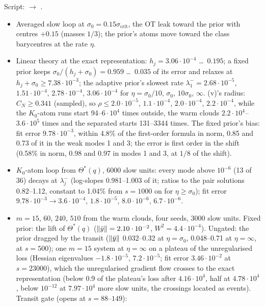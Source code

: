 Script:  $\to$ .
\begin{itemize}
  \item Averaged slow loop at $\sigma_0=0.15\sigma_{\mathrm{crit}}$, the OT leak toward the prior with centres $+0.15$
    (masses $1/3$); the prior's atoms move toward the class barycentres at the rate $\eta$.
  \item Linear theory at the exact representation: $h_j=3.06\cdot10^{-4}$ \dots\ $0.195$; a fixed prior keeps
    $\sigma_0/(h_j+\sigma_0)=0.959$ \dots\ $0.035$ of its error and relaxes at $h_j+\sigma_0\ge7.38\cdot10^{-3}$; the
    adaptive prior's slowest rate $\lambda_1^-=2.68\cdot10^{-5}$, $1.51\cdot10^{-4}$, $2.78\cdot10^{-4}$,
    $3.06\cdot10^{-4}$ for $\eta=\sigma_0/10$, $\sigma_0$, $10\sigma_0$, $\infty$. (v)'s radius: $C_N\ge0.341$
    (sampled), so $\rho\le2.0\cdot10^{-5}$, $1.1\cdot10^{-4}$, $2.0\cdot10^{-4}$, $2.2\cdot10^{-4}$, while the
    $K_0$-atom runs start 94--$6\cdot10^4$ times outside, the warm clouds $2.2\cdot10^4$--$3.6\cdot10^5$ times and the
    separated starts 131--3344 times. The fixed prior's bias: fit error $9.78\cdot10^{-3}$, within 4.8\% of the
    first-order formula in norm, 0.85 and 0.73 of it in the weak modes 1 and 3; the error is first order in the shift
    (0.58\% in norm, 0.98 and 0.97 in modes 1 and 3, at $1/8$ of the shift).
  \item $K_0$-atom loop from $\Theta^*(q)$, 6000 slow units: every mode above $10^{-6}$ (13 of 36) decays at
    $\lambda_j^-$ (log-slopes 0.981--1.003 of it; ratios to the pair solutions 0.82--1.12, constant to 1.04\% from
    $s=1000$ on for $\eta\ge\sigma_0$); fit error $9.78\cdot10^{-3}\to3.6\cdot10^{-4}$, $1.8\cdot10^{-5}$,
    $8.0\cdot10^{-6}$, $6.7\cdot10^{-6}$.
  \item $m=15$, $60$, $240$, $510$ from the warm clouds, four seeds, 3000 slow units. Fixed prior: the lift of
    $\Theta^*(q)$ ($\lVert \bar y\rVert=2.10\cdot10^{-2}$, $W^2=4.4\cdot10^{-4}$). Ungated: the prior dragged by the transit
    ($\lVert \bar y\rVert$ 0.032--0.32 at $\eta=\sigma_0$, 0.048--0.71 at $\eta=\infty$, at $s=500$); one $m=15$ system at
    $\eta=\infty$ on a plateau of the unregularised loss (Hessian eigenvalues $-1.8\cdot10^{-5}$, $7.2\cdot10^{-5}$;
    fit error $3.46\cdot10^{-2}$ at $s=23000$), which the unregularised gradient flow crosses to the exact
    representation (below 0.9 of the plateau's loss after $4.16\cdot10^4$, half at $4.78\cdot10^4$, below $10^{-12}$ at
    $7.97\cdot10^4$ more slow units, the crossings located as events). Transit gate (opens at $s=88$--$149$):

\end{itemize}
